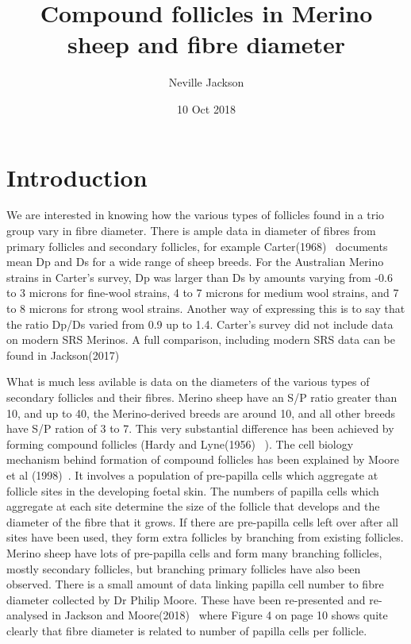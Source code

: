 \documentclass[titlepage]{article}  %
\title{ Compound follicles in Merino sheep and fibre diameter}
\author{Neville Jackson }
\date{10 Oct 2018}
\begin{document}
 
 
\maketitle      
\tableofcontents


\clearpage
\section{Introduction} 
We are interested in knowing how the various types of follicles found in a trio group vary in fibre diameter. There is ample data in diameter of fibres from primary follicles and secondary follicles, for example Carter(1968)~\cite{cart:68} documents mean Dp and Ds for a wide range of sheep breeds. For the Australian Merino strains in Carter's survey, Dp was larger than Ds by amounts varying from -0.6 to 3 microns for fine-wool strains, 4 to 7 microns for medium wool strains, and 7 to 8 microns for strong wool strains. Another way of expressing this is to say that the ratio Dp/Ds varied from 0.9 up to 1.4. Carter's survey did not include data on modern SRS Merinos. A full comparison, including modern SRS data can be found in Jackson(2017)~\cite{jack:17b}

What is much less avilable is data on the diameters of the various types of secondary follicles and their fibres.  Merino sheep have an S/P ratio greater than 10, and up to 40, the Merino-derived breeds are around 10, and all other breeds have S/P ration of 3 to 7. This very substantial difference has been achieved by forming compound follicles (Hardy and Lyne(1956)~\cite{hard:56} ). The cell biology mechanism behind formation of compound follicles has been explained by Moore et al (1998)~\cite{moor:98}. It involves a population of pre-papilla cells which aggregate at follicle sites in the developing foetal skin. The numbers of papilla cells which aggregate at each site determine the size of the follicle that develops and the diameter of the fibre that it grows. If there are pre-papilla cells left over after all sites have been used, they form extra follicles by branching from existing follicles. Merino sheep have lots of pre-papilla cells and form many branching follicles, mostly secondary follicles, but branching primary follicles have also been observed. There is a small amount of data linking papilla cell number to fibre diameter collected by Dr Philip Moore. These have been re-presented and re-analysed in Jackson and Moore(2018)~\cite{jamo:18} where Figure 4 on page 10 shows quite clearly that fibre diameter is related to number of papilla cells per follicle.
\end{document}
